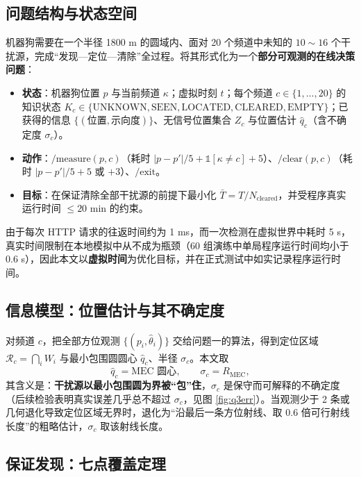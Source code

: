 \documentclass[withoutpreface,bwprint]{cumcmthesis}
\begin{document}
\subsection{问题结构与状态空间}

机器狗需要在一个半径 1800 m 的圆域内、面对 20 个频道中未知的 $10\sim16$ 个干扰源，完成“发现—定位—清除”全过程。将其形式化为一个\textbf{部分可观测的在线决策问题}：

\begin{itemize}
  \item \textbf{状态}：机器狗位置 $p$ 与当前频道 $\kappa$；虚拟时刻 $t$；每个频道 $c\in\{1,\dots,20\}$ 的知识状态 $K_c\in\{\text{UNKNOWN},\text{SEEN},\text{LOCATED},\text{CLEARED},\text{EMPTY}\}$；已获得的信息 $\{(\text{位置},\text{示向度})\}$、无信号位置集合 $Z_c$ 与位置估计 $\hat q_c$（含不确定度 $\sigma_c$）。
  \item \textbf{动作}：$\text{/measure}(p,c)$（耗时 $|p-p'|/5+\mathbb 1[\kappa\ne c]+5$）、$\text{/clear}(p,c)$（耗时 $|p-p'|/5+5$ 或 $+3$）、$\text{/exit}$。
  \item \textbf{目标}：在保证清除全部干扰源的前提下最小化 $\bar T=T/N_{\text{cleared}}$，并受程序真实运行时间 $\le20$ min 的约束。
\end{itemize}

由于每次 HTTP 请求的往返时间约为 1 ms，而一次检测在虚拟世界中耗时 5 s，真实时间限制在本地模拟中从不成为瓶颈（60 组演练中单局程序运行时间均小于 0.6 s），因此本文以\textbf{虚拟时间}为优化目标，并在正式测试中如实记录程序运行时间。

\subsection{信息模型：位置估计与其不确定度}

对频道 $c$，把全部方位观测 $\{(p_i,\hat\theta_i)\}$ 交给问题一的算法，得到定位区域 $\mathcal R_c=\bigcap_i W_i$ 与最小包围圆圆心 $\hat q_c$、半径 $\sigma_c$。本文取
\begin{equation}
\hat q_c=\text{MEC 圆心},\qquad \sigma_c=R_{\mathrm{MEC}},
\end{equation}
其含义是：\textbf{干扰源以最小包围圆为界被“包”住}，$\sigma_c$ 是保守而可解释的不确定度（后续检验表明真实误差几乎总不超过 $\sigma_c$，见图 \ref{fig:q3err}）。当观测少于 2 条或几何退化导致定位区域无界时，退化为“沿最后一条方位射线、取 $0.6$ 倍可行射线长度”的粗略估计，$\sigma_c$ 取该射线长度。

\subsection{保证发现：七点覆盖定理}
\end{document}
